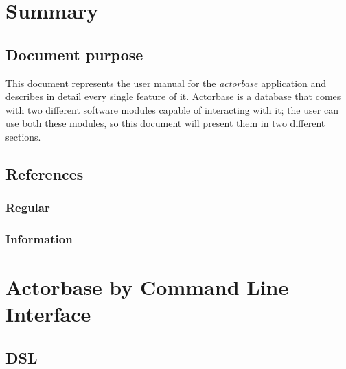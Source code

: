 \documentclass{scalatekids-article}
\begin{document}
\section{Summary}
\subsection{Document purpose}
This document represents the user manual for the \textit{actorbase} application and describes in detail every single feature of it.
Actorbase is a database that comes with two different software modules capable of interacting with it; the user can use both these modules, so this document will present them in two different sections.

\prodPurpose

\subsection{References}

\subsubsection{Regular} %

\subsubsection{Information} %




\section{Actorbase by Command Line Interface}

\subsection{DSL}

\end{document}
